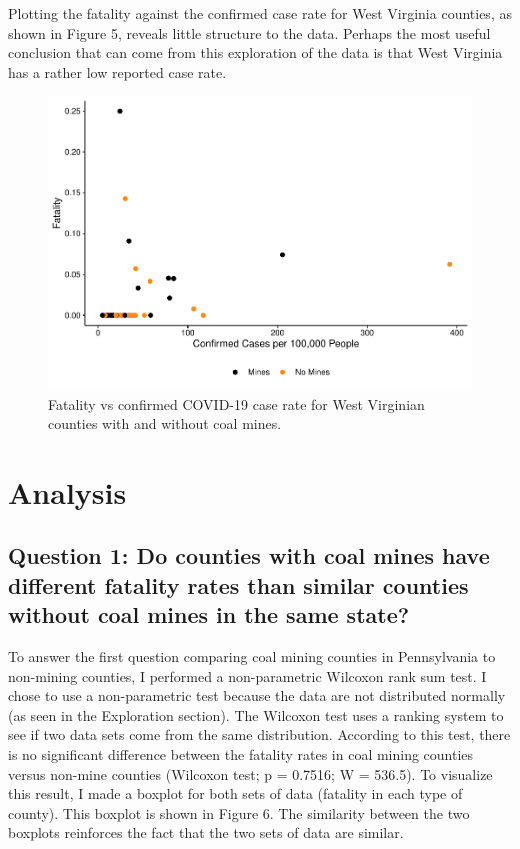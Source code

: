 \documentclass[
  12pt,
]{article}
\begin{document}
Plotting the fatality against the confirmed case rate for West Virginia
counties, as shown in Figure 5, reveals little structure to the data.
Perhaps the most useful conclusion that can come from this exploration
of the data is that West Virginia has a rather low reported case rate.

\begin{figure}
\centering
\includegraphics{Hancock_ENV872_Project_files/figure-latex/WV Fatality vs Case Rate-1.pdf}
\caption{Fatality vs confirmed COVID-19 case rate for West Virginian
counties with and without coal mines.}
\end{figure}

\newpage

\hypertarget{analysis}{%
\section{Analysis}\label{analysis}}

\hypertarget{question-1-do-counties-with-coal-mines-have-different-fatality-rates-than-similar-counties-without-coal-mines-in-the-same-state}{%
\subsection{Question 1: Do counties with coal mines have different
fatality rates than similar counties without coal mines in the same
state?}\label{question-1-do-counties-with-coal-mines-have-different-fatality-rates-than-similar-counties-without-coal-mines-in-the-same-state}}

To answer the first question comparing coal mining counties in
Pennsylvania to non-mining counties, I performed a non-parametric
Wilcoxon rank sum test. I chose to use a non-parametric test because the
data are not distributed normally (as seen in the Exploration section).
The Wilcoxon test uses a ranking system to see if two data sets come
from the same distribution. According to this test, there is no
significant difference between the fatality rates in coal mining
counties versus non-mine counties (Wilcoxon test; p = 0.7516; W =
536.5). To visualize this result, I made a boxplot for both sets of data
(fatality in each type of county). This boxplot is shown in Figure 6.
The similarity between the two boxplots reinforces the fact that the two
sets of data are similar.
\end{document}
